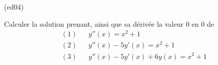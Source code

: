 \begin{tiny}(ed04)\end{tiny}
Calculer la solution prenant, ainsi que sa d{\'e}riv{\'e}e la valeur 0 en 0 de
\begin{align*}
&(1)& &y''(x) = x^{2}+1 \\
&(2)& &y''(x)-5y'(x) = x^{2}+1 \\
&(3)& &y''(x) -5y'(x) + 6y(x) = x^{2}+1
\end{align*}